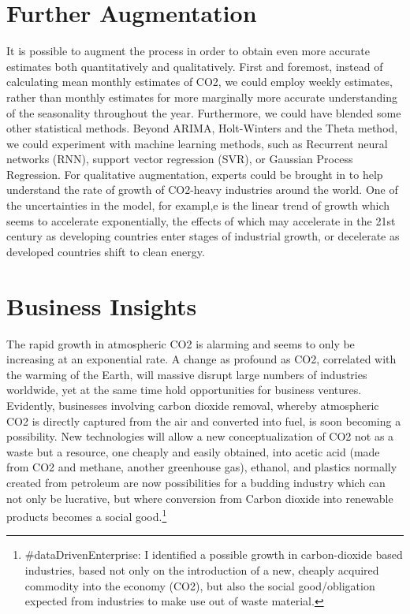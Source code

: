 \documentclass{article}
\begin{document}
\section*{Further Augmentation}
It is possible to augment the process in order to obtain even more accurate estimates both quantitatively and qualitatively. First and foremost, instead of calculating mean monthly estimates of CO2, we could employ weekly estimates, rather than monthly estimates for more marginally more accurate understanding of the seasonality throughout the year. Furthermore, we could have blended some other statistical methods. Beyond ARIMA, Holt-Winters and the Theta method, we could experiment with machine learning methods, such as Recurrent neural networks (RNN), support vector regression (SVR), or Gaussian Process Regression. For qualitative augmentation, experts could be brought in to help understand the rate of growth of CO2-heavy industries around the world. One of the uncertainties in the model, for exampl,e is the linear trend of growth which seems to accelerate exponentially, the effects of which may accelerate in the 21st century as developing countries enter stages of industrial growth, or decelerate as developed countries shift to clean energy. 

\section*{Business Insights}
The rapid growth in atmospheric CO2 is alarming and seems to only be increasing at an exponential rate. A change as profound as CO2, correlated with the warming of the Earth, will massive disrupt large numbers of industries worldwide, yet at the same time hold opportunities for business ventures. Evidently, businesses involving carbon dioxide removal, whereby atmospheric CO2 is directly captured from the air and converted into fuel, is soon becoming a possibility. New technologies will allow a new conceptualization of CO2 not as a waste but a resource, one cheaply and easily obtained, into acetic acid (made from CO2 and methane, another greenhouse gas), ethanol, and plastics normally created from petroleum are now possibilities for a budding industry which can not only be lucrative, but where conversion from Carbon dioxide into renewable products becomes a social good.\footnote{\#dataDrivenEnterprise: I identified a possible growth in carbon-dioxide based industries, based not only on the introduction of a new, cheaply acquired commodity into the economy (CO2), but also the social good/obligation expected from industries to make use out of waste material.}
\end{document}
